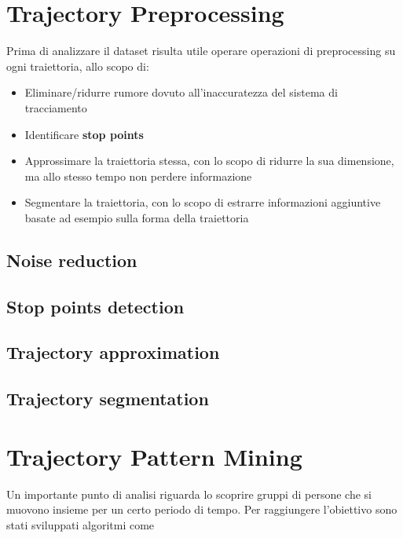 \documentclass[12pt]{article}
\begin{document}
\section{Trajectory Preprocessing}
Prima di analizzare il dataset risulta utile operare operazioni di preprocessing su ogni traiettoria, allo scopo di:
\begin{itemize}
    \item Eliminare/ridurre rumore dovuto all'inaccuratezza del sistema di tracciamento
    \item Identificare \textbf{stop points}
    \item Approssimare la traiettoria stessa, con lo scopo di ridurre la sua dimensione, ma allo stesso tempo non perdere informazione
    \item Segmentare la traiettoria, con lo scopo di estrarre informazioni aggiuntive basate ad esempio sulla forma della traiettoria
\end{itemize}
\subsection{Noise reduction}
\subsection{Stop points detection}
\subsection{Trajectory approximation}
\subsection{Trajectory segmentation}
\section{Trajectory Pattern Mining}
Un importante punto di analisi riguarda lo scoprire gruppi di persone che si muovono insieme per un certo periodo di tempo. Per raggiungere l'obiettivo sono stati sviluppati algoritmi come
\end{document}
